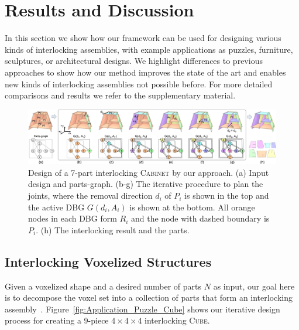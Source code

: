 

\section{Results and Discussion}
\label{sec:results}

In this section we show how our framework can be used for designing various kinds of interlocking assemblies, with example applications as puzzles, furniture, sculptures, or architectural designs. We highlight differences to previous approaches to show how our method improves the state of the art and enables new kinds of interlocking assemblies not possible before. For more detailed comparisons and results we refer to the supplementary material.


\begin{figure}[!t]
	\centering
	\includegraphics[width=17.75cm]{images/Application_Plate_Cabinet.png}
	\vspace*{-3.5mm}
	\caption{Design of a 7-part interlocking \textsc{Cabinet} by our approach.
		(a) Input design and parts-graph.
		(b-g) The iterative procedure to plan the joints, where the removal direction $d_i$ of $P_i$ is shown in the top and
		the active DBG $G(d_i, A_i)$ is shown at the bottom.
		All orange nodes in each DBG form $R_i$ and the node with dashed boundary is $P_i$.
		(h) The interlocking result and the parts.}
	\vspace*{-2.0mm}
	\label{fig:Application_Plate_Cabinet}
\end{figure}

\subsection{Interlocking Voxelized Structures}
\label{subsec:puzzle}

Given a voxelized shape and a desired number of parts $N$ as input, our goal here is to decompose the voxel set into a collection of parts that form an interlocking assembly~\cite{Song-2012-InterCubes}.
Figure~\ref{fig:Application_Puzzle_Cube} shows our iterative design process for creating a 9-piece $4\times 4 \times 4$ interlocking {\textsc{Cube}}.


